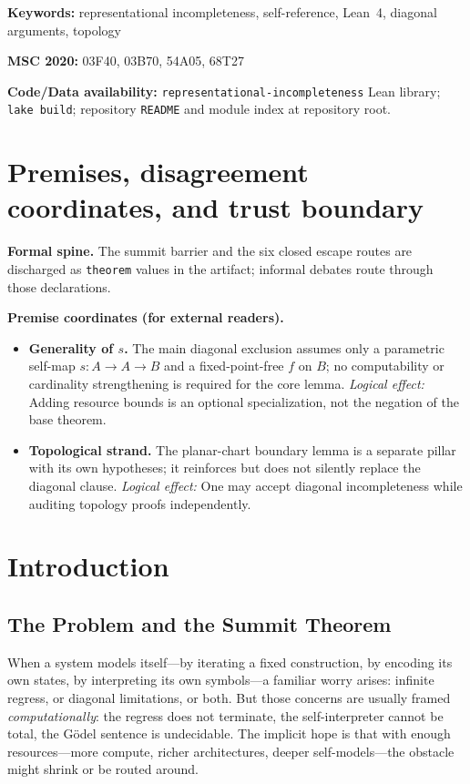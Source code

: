 \documentclass[11pt]{article}
\begin{document}
\noindent\textbf{Keywords:} representational incompleteness, self-reference, Lean~4, diagonal arguments, topology

\noindent\textbf{MSC 2020:} 03F40, 03B70, 54A05, 68T27

\noindent\textbf{Code/Data availability:}
\texttt{representational-incompleteness} Lean library;
\texttt{lake build};
repository \texttt{README} and module index at repository root.

\section{Premises, disagreement coordinates, and trust boundary}\label{sec:premises-ri-flagship}
\begin{keybox}[title=Where disagreement can (and cannot) live]
\textbf{Formal spine.}
The summit barrier and the six closed escape routes are discharged as \texttt{theorem} values in the artifact; informal debates route through those declarations.

\medskip
\textbf{Premise coordinates (for external readers).}
\begin{itemize}[leftmargin=2em]
\item \textbf{Generality of $s$.} The main diagonal exclusion assumes only a parametric self-map $s:A\to A\to B$ and a fixed-point-free $f$ on $B$; no computability or cardinality strengthening is required for the core lemma.
  \emph{Logical effect:} Adding resource bounds is an optional specialization, not the negation of the base theorem.
\item \textbf{Topological strand.} The planar-chart boundary lemma is a separate pillar with its own hypotheses; it reinforces but does not silently replace the diagonal clause.
  \emph{Logical effect:} One may accept diagonal incompleteness while auditing topology proofs independently.
\end{itemize}
\end{keybox}

\section{Introduction}
\label{sec:intro}

\subsection{The Problem and the Summit Theorem}
When a system models itself---by iterating a fixed construction, by
encoding its own states, by interpreting its own symbols---a familiar worry
arises: infinite regress, or diagonal limitations, or both.  But those
concerns are usually framed \emph{computationally}: the regress does not
terminate, the self-interpreter cannot be total, the G\"odel sentence is
undecidable.  The implicit hope is that with enough resources---more
compute, richer architectures, deeper self-models---the obstacle might
shrink or be routed around.
\end{document}
